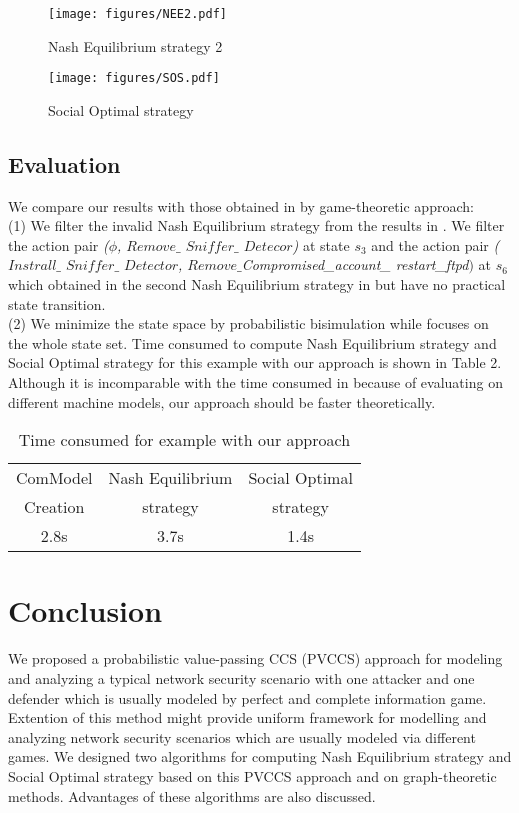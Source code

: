 \documentclass{acm_proc_article-sp}
\begin{document}
\begin{figure}[!htb]
\begin{center}
\texttt{[image: figures/NEE2.pdf]}
\caption{Nash Equilibrium strategy 2}
\label{nash2}
\end{center}
\end{figure}

\begin{figure}[!htb]
\begin{center}
\texttt{[image: figures/SOS.pdf]}
\caption{Social Optimal strategy}
\label{sos}
\end{center}
\end{figure}

\subsection{Evaluation}
We compare our results with those obtained in \cite{klye} by game-theoretic approach: \\
(1) We filter the invalid Nash Equilibrium strategy from the results in \cite{klye}. We filter the action pair \textit{($\phi$, $Remove\_$ $\textit{Sniffer}\_$ $Detecor$)} at state $s_3$ and the action pair \textit{($Instrall\_$ $\textit{Sniffer}\_$ $Detector$, $Remove\_$Compromised\_$ $account\_ $ $restart\_$ $\textit{ftpd}$)$} at $s_6$ which obtained in the second Nash Equilibrium strategy in \cite{klye} but have no practical state transition.\\
(2) We minimize the state space by probabilistic bisimulation while   \cite{klye} focuses on the whole state set. Time consumed to compute Nash Equilibrium strategy and Social Optimal strategy for this example with our approach is shown in Table 2. Although it is incomparable with the time consumed in \cite{klye} because of evaluating on different machine models, our approach should be faster theoretically.

\begin{table}[htpd]
\centering
\scriptsize
\label{comsume}
\begin{tabular}{ccc}\hline
ComModel& Nash Equilibrium & Social Optimal\\
Creation &  strategy &  strategy \\\hline
2.8s & 3.7s & 1.4s\\\hline
\end{tabular}
\caption{Time consumed for example with our approach}
\end{table}

\section{Conclusion}
We proposed a probabilistic value-passing CCS (PVCCS) approach for modeling and analyzing a typical network security scenario with one attacker and one defender which is usually modeled by perfect and complete information game.
Extention of this method might provide uniform framework for modelling and analyzing network security scenarios which are usually modeled via different games.
We designed two algorithms for computing Nash Equilibrium strategy and Social Optimal strategy based on this PVCCS approach and on graph-theoretic methods. Advantages of these algorithms are also discussed.
\end{document}
